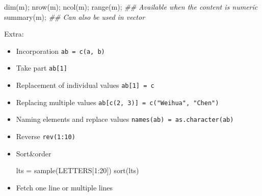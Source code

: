 \documentclass[
]{article}
\newenvironment{Shaded}{}{}
\newcommand{\CommentTok}[1]{\textcolor[rgb]{0.38,0.63,0.69}{\textit{#1}}}
\newcommand{\DecValTok}[1]{\textcolor[rgb]{0.25,0.63,0.44}{#1}}
\newcommand{\DocumentationTok}[1]{\textcolor[rgb]{0.73,0.13,0.13}{\textit{#1}}}
\newcommand{\FunctionTok}[1]{\textcolor[rgb]{0.02,0.16,0.49}{#1}}
\newcommand{\NormalTok}[1]{#1}
\newcommand{\OtherTok}[1]{\textcolor[rgb]{0.00,0.44,0.13}{#1}}
\newcommand{\SpecialCharTok}[1]{\textcolor[rgb]{0.25,0.44,0.63}{#1}}
\newcommand{\StringTok}[1]{\textcolor[rgb]{0.25,0.44,0.63}{#1}}
\begin{document}
\begin{Shaded}
\begin{Highlighting}[]
\FunctionTok{dim}\NormalTok{(m);}
\FunctionTok{nrow}\NormalTok{(m);}
\FunctionTok{ncol}\NormalTok{(m);}
\FunctionTok{range}\NormalTok{(m); }\DocumentationTok{\#\# Available when the content is numeric}
\FunctionTok{summary}\NormalTok{(m); }\DocumentationTok{\#\# Can also be used in vector}
\end{Highlighting}
\end{Shaded}

Extra:

\begin{itemize}
\item
  Incorporation \texttt{ab\ =\ c(a,\ b)}
\item
  Take part \texttt{ab{[}1{]}}
\item
  Replacement of individual values \texttt{ab{[}1{]}\ =\ c}
\item
  Replacing multiple values
  \texttt{ab{[}c(2,\ 3){]}\ =\ c("Weihua",\ "Chen")}
\item
  Naming elements and replace values
  \texttt{names(ab)\ =\ as.character(ab)}
\item
  Reverse \texttt{rev(1:10)}
\item
  Sort\&order

\begin{Shaded}
\begin{Highlighting}[]
\NormalTok{lts }\OtherTok{=} \FunctionTok{sample}\NormalTok{(LETTERS[}\DecValTok{1}\SpecialCharTok{:}\DecValTok{20}\NormalTok{])}
\FunctionTok{sort}\NormalTok{(lts)}
\end{Highlighting}
\end{Shaded}
\item
  Fetch one line or multiple lines

\begin{Shaded}
\end{Shaded}


\end{itemize}
\end{document}

